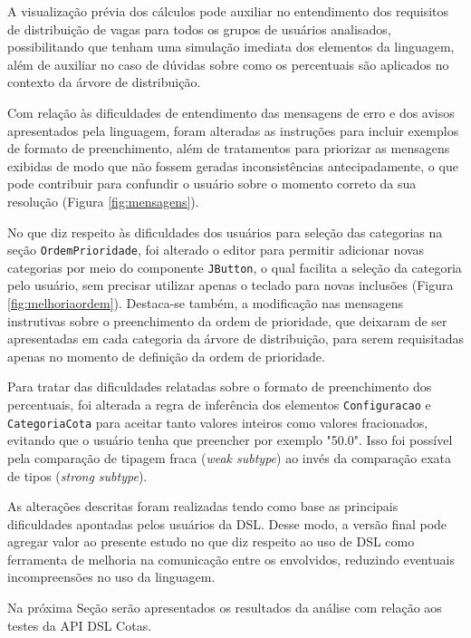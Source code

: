 \clearpage



A visualização prévia dos cálculos pode auxiliar no entendimento dos requisitos de distribuição de vagas para todos os grupos de usuários analisados, possibilitando que tenham uma simulação imediata dos elementos da linguagem, além de auxiliar no caso de dúvidas sobre como os percentuais são aplicados no contexto da árvore de distribuição.

Com relação às dificuldades de entendimento das mensagens de erro e dos avisos apresentados pela linguagem, foram alteradas as instruções para incluir exemplos de formato de preenchimento, além de tratamentos para priorizar as mensagens exibidas de modo que não fossem geradas inconsistências antecipadamente, o que pode contribuir para confundir o usuário sobre o momento correto da sua resolução (Figura \ref{fig:mensagens}).



No que diz respeito às dificuldades dos usuários para seleção das categorias na seção \texttt{OrdemPrioridade}, foi alterado o editor para permitir adicionar novas categorias por meio do componente \texttt{JButton}, o qual facilita a seleção da categoria pelo usuário, sem precisar utilizar apenas o teclado para novas inclusões (Figura \ref{fig:melhoriaordem}). Destaca-se também, a modificação nas mensagens instrutivas sobre o preenchimento da ordem de prioridade, que deixaram de ser apresentadas em cada categoria da árvore de distribuição, para serem requisitadas apenas no momento de definição da ordem de prioridade.



Para tratar das dificuldades relatadas sobre o formato de preenchimento dos percentuais, foi alterada a regra de inferência dos elementos \texttt{Configuracao} e \texttt{CategoriaCota} para aceitar tanto valores inteiros como valores fracionados, evitando que o usuário tenha que preencher por exemplo "50.0". Isso foi possível pela comparação de tipagem fraca (\textit{weak subtype}) ao invés da comparação exata de tipos (\textit{strong subtype}).



\newpage
As alterações descritas foram realizadas tendo como base as principais dificuldades apontadas pelos usuários da DSL. Desse modo, a versão final pode agregar valor ao presente estudo no que diz respeito ao uso de DSL como ferramenta de melhoria na comunicação entre os envolvidos, reduzindo eventuais incompreensões no uso da linguagem.

Na próxima Seção serão apresentados os resultados da análise com relação aos testes da \gls{API} DSL Cotas.